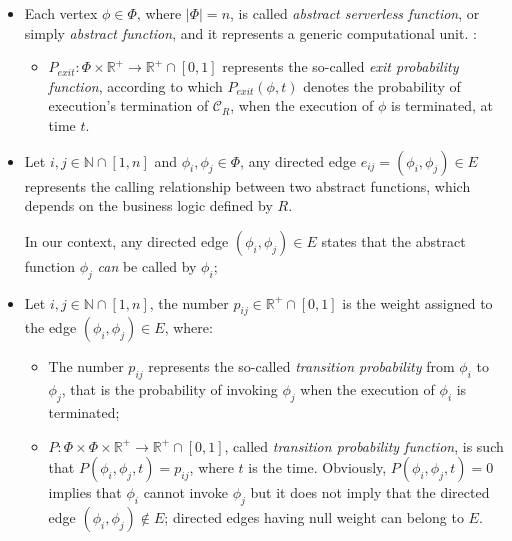 \documentclass[12pt,a4paper]{report}
\newcommand{\N}{\mathbb{N}}
\newcommand{\Rplus}{\mathbb{R}^+}
\newcommand{\SetFromZeroToOne}{\left[0,1\right]}
\begin{document}
\begin{itemize}
				
	\item Each vertex $\phi \in \Phi$, where $|\Phi| = n$, is called \textit{abstract serverless function}, or simply \textit{abstract  function}, and it represents a generic computational unit. :
	
	\begin{itemize}
				
		\item $P_{exit} : \Phi \times \Rplus \to \Rplus \cap \SetFromZeroToOne$ represents the so-called \textit{exit probability function}, according to which $P_{exit}(\phi,t)$ denotes the probability of execution's termination of $\mathcal{C}_R$, when the execution of $\phi$ is terminated, at time $t$.
	\end{itemize}
	
	\item Let $i,j \in \N \cap \left[ 1, n \right]$ and $\phi_i, \phi_j \in \Phi$, any directed edge $e_{ij} = \left( \phi_i, \phi_j \right) \in E$ represents the calling relationship between two abstract functions, which depends on the business logic defined by $R$. 
	
	In our context, any directed edge $\left( \phi_i, \phi_j \right) \in E$ states that the abstract function $\phi_j$ \textit{can} be called by $\phi_i$;
	
	\item Let $i,j \in \N \cap \left[ 1, n \right]$, the number $p_{ij} \in \Rplus \cap \SetFromZeroToOne$ is the weight assigned to the edge $\left(\phi_i, \phi_j \right) \in E$, where: 
	
	\begin{itemize}
		
		\item The number $p_{ij}$ represents the so-called \textit{transition probability} from $\phi_i$ to $\phi_j$, that is the probability of invoking $\phi_j$ when the execution of $\phi_i$ is terminated;
		
		\item $P : \Phi \times \Phi \times \Rplus \to \Rplus \cap \left[ 0, 1 \right]$, called \textit{transition probability function}, is such that $P\left(\phi_i, \phi_j, t \right) = p_{ij}$, where $t$ is the time. Obviously, $P\left(\phi_i, \phi_j, t \right) = 0$ implies that $\phi_i$ cannot invoke $\phi_j$ but it does not imply that the directed edge $\left( \phi_i, \phi_j \right) \notin E$; directed edges having null weight can belong to $E$.
		

\end{itemize}
\end{itemize}
\end{document}
